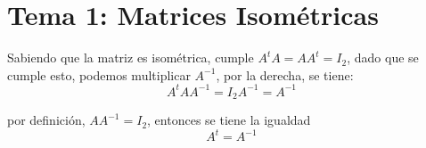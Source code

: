 \section{Tema 1: Matrices Isométricas}

Sabiendo que la matriz es isométrica, cumple $A^t A = AA^t = I_2$, dado que se cumple esto, podemos multiplicar $A^{-1}$, por la derecha, se tiene:
	$$A^t AA^{-1} = I_2 A^{-1} = A^{-1}$$
	
por definición, $AA^{-1} = I_2$, entonces se tiene la igualdad
	$$\boxed{A^t = A^{-1}}$$